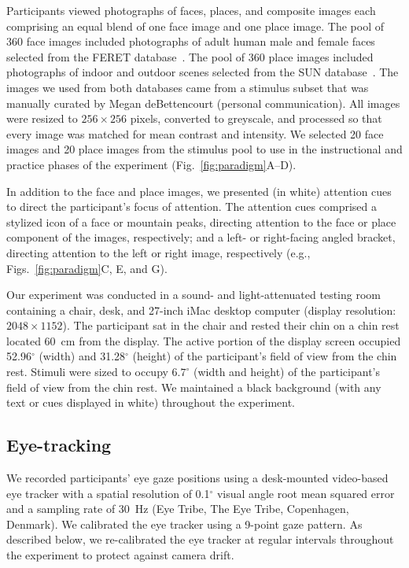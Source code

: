 \documentclass[english]{article}
\begin{document}
Participants viewed photographs of faces, places, and composite images each
comprising an equal blend of one face image and one place image. The pool of
360 face images included photographs of adult human male and female faces
selected from the FERET database~\citep{PhilEtal98}. The pool of 360 place
images included photographs of indoor and outdoor scenes selected from the SUN
database~\citep{XiaoEtal10}. The images we used from both databases came from a
stimulus subset that was manually curated by Megan deBettencourt (personal
communication). All images were resized to $256 \times 256$ pixels, converted
to greyscale, and processed so that every image was matched for mean contrast
and intensity. We selected 20 face images and 20 place images from the stimulus
pool to use in the instructional and practice phases of the experiment
(Fig.~\ref{fig:paradigm}A--D).

In addition to the face and place images, we presented (in white) attention
cues to direct the participant's focus of attention. The attention cues
comprised a stylized icon of a face or mountain peaks, directing attention to
the face or place component of the images, respectively; and a left- or
right-facing angled bracket, directing attention to the left or right image,
respectively (e.g., Figs.~\ref{fig:paradigm}C, E, and G).

 Our experiment was conducted in a sound- and light-attenuated testing room
 containing a chair, desk, and 27-inch iMac desktop computer (display
 resolution: $2048 \times 1152$). The participant sat in the chair and rested
 their chin on a chin rest located 60~cm from the display. The active portion
 of the display screen occupied 52.96$^\circ$ (width) and 31.28$^\circ$
 (height) of the participant's field of view from the chin rest. Stimuli were
 sized to occupy $6.7^\circ$ (width and height) of the participant's field of
 view from the chin rest. We maintained a black background (with any text or
 cues displayed in white) throughout the experiment.

\subsection*{Eye-tracking}

We recorded participants' eye gaze positions using a desk-mounted video-based
eye tracker with a spatial resolution of 0.1$^\circ$ visual angle root mean
squared error and a sampling rate of 30~Hz (Eye Tribe, The Eye Tribe,
Copenhagen, Denmark). We calibrated the eye tracker using a 9-point gaze
pattern. As described below, we re-calibrated the eye tracker at regular
intervals throughout the experiment to protect against camera drift.
\end{document}
